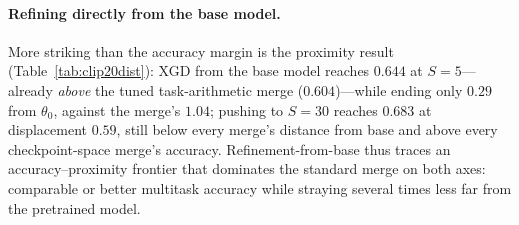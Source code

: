 \documentclass{article} %
\begin{document}

\iffalse
\paragraph{Refining directly from the base model.}
More striking than the accuracy margin is the proximity result (Table~\ref{tab:clip20dist}): XGD from the base model reaches $0.644$ at $S=5$---already \emph{above} the tuned task-arithmetic merge ($0.604$)---while ending only $0.29$ from $\theta_0$, against the merge's $1.04$; pushing to $S=30$ reaches $0.683$ at displacement $0.59$, still below every merge's distance from base and above every checkpoint-space merge's accuracy. Refinement-from-base thus traces an accuracy--proximity frontier that dominates the standard merge on both axes: comparable or better multitask accuracy while straying several times less far from the pretrained model.
\end{document}
